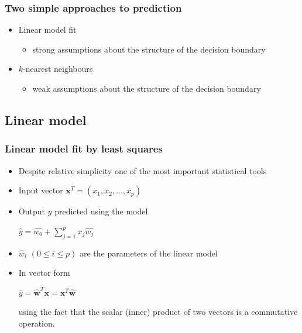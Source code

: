 \documentclass[notes]{beamer}          %
\newcommand{\vect}[1]{\bm{#1}}
\begin{document}
\begin{frame}
\frametitle{Two simple approaches to prediction}
\begin{itemize}
    \item Linear model fit
        \begin{itemize}
            \item strong assumptions about the structure of the decision boundary
        \end{itemize}
    \item $k$-nearest neighbours
        \begin{itemize}
            \item weak assumptions about the structure of the decision boundary
        \end{itemize}
\end{itemize}

\end{frame}

\subsection{Linear model}

\begin{frame}
\frametitle{Linear model fit by least squares}
    \begin{itemize}
        \item Despite relative simplicity one of the most important statistical tools
        \item Input vector $\vect{x}^T = (x_1, x_2, \ldots, x_p)$
        \item Output $y$ predicted using the model \\
            \begin{center}
            $\hat{y} = \hat{w_0} + \sum_{j=1}^{p} x_j \hat{w_j}$
            \end{center}
        \item $\hat{w}_i$ $ (0 \leq i \leq p)$ are the parameters of the linear model
        \item In vector form
            \begin{center}
            $\hat{y} = \hat{\vect{w}}^T\vect{x} = \vect{x}^T \hat{\vect{w}}$
            \end{center}
            using the fact that the scalar (inner) product of two vectors is a commutative operation.
    \end{itemize}
\end{frame}
\end{document}

